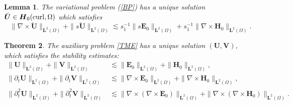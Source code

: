 \documentclass[11pt,reqno]{amsart}
\newtheorem{theo}{Theorem}[section]
\newtheorem{lemm}[theo]{Lemma}
\numberwithin{equation}{section}
\begin{document}
\begin{lemm}\label{ase}
The variational problem (\ref{BP}) has a unique solution $\breve {\boldsymbol U}
\in \boldsymbol H_0 ({\rm curl}, \Omega)$ which satisfies
\[
\|\nabla \times \breve {\boldsymbol U}\|_{\boldsymbol L^2 (\Omega)} +\|s  \breve
{\boldsymbol U}\|_{\boldsymbol L^2 (\Omega)}\lesssim  s_1 ^{-1} \| s \boldsymbol
E_0\|_{\boldsymbol L^2 (\Omega)} + s_1^{-1} \|\nabla \times \boldsymbol
H_0\|_{\boldsymbol L^2 (\Omega)}.
\]
\end{lemm}

 \begin{theo}
The auxiliary problem \eqref {TME} has  a unique solution $(\boldsymbol U,
\boldsymbol V)$, which satisfies the stability estimates:
\begin{align*}
 \|\boldsymbol U\|_{\boldsymbol L^2 (\Omega)}+\| \boldsymbol V \|_{\boldsymbol L
^2 (\Omega)}  &\lesssim \|\boldsymbol E_0\|_{\boldsymbol L^2 (\Omega)}
+\|\boldsymbol H_0\|_{\boldsymbol L ^2 (\Omega)},\\
  \| \partial_t \boldsymbol U\|_{\boldsymbol L^2 (\Omega)} +\| \partial_t
\boldsymbol V \|_{\boldsymbol L ^2 (\Omega)}   &\lesssim \|\nabla \times
\boldsymbol E_0\|_{\boldsymbol L^2 (\Omega)} +\|\nabla \times \boldsymbol
H_0\|_{\boldsymbol L ^2 (\Omega)},\\
  \| \partial^2_t \boldsymbol U\|_{\boldsymbol L^2 (\Omega)}+\| \partial^2_t
\boldsymbol V \|_{\boldsymbol L ^2 (\Omega)}  &\lesssim \|\nabla \times (\nabla
\times \boldsymbol E_0)\|_{\boldsymbol L^2 (\Omega)} +\|\nabla \times (\nabla
\times \boldsymbol H_0)\|_{\boldsymbol L ^2 (\Omega)}.
\end{align*}
\end{theo}
 
\end{document}
